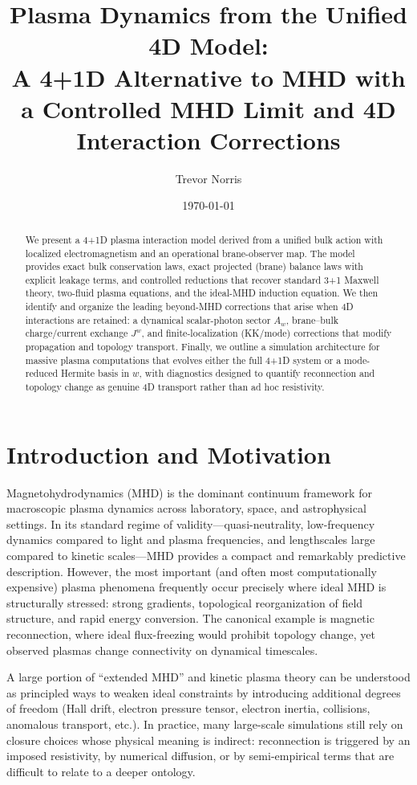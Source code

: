 \documentclass[11pt]{article}
\title{Plasma Dynamics from the Unified 4D Model:\\
A 4+1D Alternative to MHD with a Controlled MHD Limit and 4D Interaction Corrections}
\author{Trevor Norris}
\date{\today}
\begin{document}
\maketitle

\begin{abstract}
We present a 4+1D plasma interaction model derived from a unified bulk action with localized electromagnetism and an operational brane-observer map. The model provides exact bulk conservation laws, exact projected (brane) balance laws with explicit leakage terms, and controlled reductions that recover standard 3+1 Maxwell theory, two-fluid plasma equations, and the ideal-MHD induction equation. We then identify and organize the leading beyond-MHD corrections that arise when 4D interactions are retained: a dynamical scalar-photon sector \(A_w\), brane--bulk charge/current exchange \(J^w\), and finite-localization (KK/mode) corrections that modify propagation and topology transport. Finally, we outline a simulation architecture for massive plasma computations that evolves either the full 4+1D system or a mode-reduced Hermite basis in \(w\), with diagnostics designed to quantify reconnection and topology change as genuine 4D transport rather than ad hoc resistivity.
\end{abstract}

\section{Introduction and Motivation}
\label{sec:intro}

Magnetohydrodynamics (MHD) is the dominant continuum framework for macroscopic plasma dynamics across laboratory, space, and astrophysical settings. In its standard regime of validity---quasi-neutrality, low-frequency dynamics compared to light and plasma frequencies, and lengthscales large compared to kinetic scales---MHD provides a compact and remarkably predictive description. However, the most important (and often most computationally expensive) plasma phenomena frequently occur precisely where ideal MHD is structurally stressed: strong gradients, topological reorganization of field structure, and rapid energy conversion. The canonical example is magnetic reconnection, where ideal flux-freezing would prohibit topology change, yet observed plasmas change connectivity on dynamical timescales.

A large portion of ``extended MHD'' and kinetic plasma theory can be understood as principled ways to weaken ideal constraints by introducing additional degrees of freedom (Hall drift, electron pressure tensor, electron inertia, collisions, anomalous transport, etc.). In practice, many large-scale simulations still rely on closure choices whose physical meaning is indirect: reconnection is triggered by an imposed resistivity, by numerical diffusion, or by semi-empirical terms that are difficult to relate to a deeper ontology.
\end{document}

